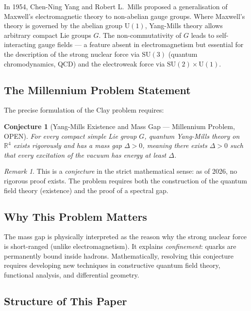 \documentclass[12pt,a4paper]{amsart}
\newtheorem{conjecture}[theorem]{Conjecture}
\theoremstyle{definition}
\theoremstyle{remark}
\newtheorem{remark}[theorem]{Remark}
\begin{document}
In 1954, Chen-Ning Yang and Robert L.\ Mills \cite{YangMills1954} proposed a
generalisation of Maxwell's electromagnetic theory to non-abelian gauge groups. Where
Maxwell's theory is governed by the abelian group $\mathrm{U}(1)$, Yang-Mills theory
allows arbitrary compact Lie groups $G$. The non-commutativity of $G$ leads to
self-interacting gauge fields — a feature absent in electromagnetism but essential for
the description of the strong nuclear force via $\mathrm{SU}(3)$ (quantum
chromodynamics, QCD) and the electroweak force via $\mathrm{SU}(2) \times \mathrm{U}(1)$.

\subsection{The Millennium Problem Statement}

The precise formulation of the Clay problem \cite{JaffeWitten2000} requires:

\begin{conjecture}[Yang-Mills Existence and Mass Gap — Millennium Problem, OPEN]
\label{conj:mass-gap}
For every compact simple Lie group $G$, quantum Yang-Mills theory on $\mathbb{R}^4$
exists rigorously and has a mass gap $\Delta > 0$, meaning there exists $\Delta > 0$
such that every excitation of the vacuum has energy at least $\Delta$.
\end{conjecture}

\begin{remark}
This is a \emph{conjecture} in the strict mathematical sense: as of 2026, no rigorous
proof exists. The problem requires both the construction of the quantum field theory
(existence) and the proof of a spectral gap.
\end{remark}

\subsection{Why This Problem Matters}

The mass gap is physically interpreted as the reason why the strong nuclear force is
short-ranged (unlike electromagnetism). It explains \emph{confinement}: quarks are
permanently bound inside hadrons. Mathematically, resolving this conjecture requires
developing new techniques in constructive quantum field theory, functional analysis,
and differential geometry.

\subsection{Structure of This Paper}
\end{document}
